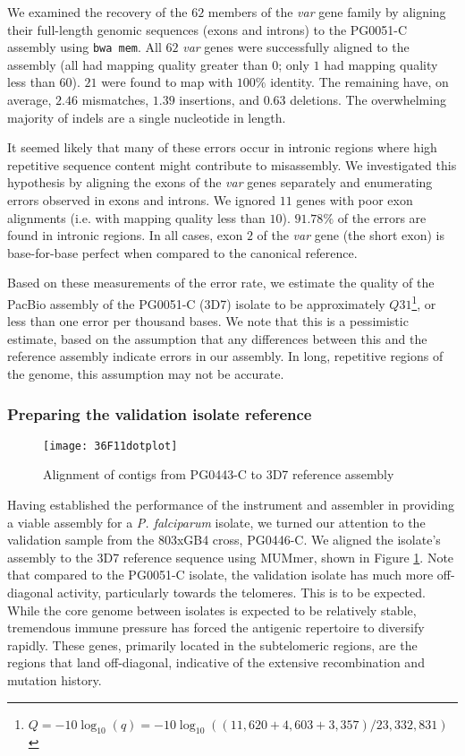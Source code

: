 We examined the recovery of the $62$ members of the \textit{var} gene family by aligning their full-length genomic sequences (exons and introns) to the PG0051-C assembly using \texttt{bwa mem}. All $62$ \textit{var} genes were successfully aligned to the assembly (all had mapping quality greater than $0$; only $1$ had mapping quality less than 60).  $21$ were found to map with $100\%$ identity. The remaining have, on average, $2.46$ mismatches, $1.39$ insertions, and $0.63$ deletions. The overwhelming majority of indels are a single nucleotide in length.

It seemed likely that many of these errors occur in intronic regions where high repetitive sequence content might contribute to misassembly. We investigated this hypothesis by aligning the exons of the \textit{var} genes separately and enumerating errors observed in exons and introns. We ignored $11$ genes with poor exon alignments (i.e. with mapping quality less than $10$). $91.78\%$ of the errors are found in intronic regions. In all cases, exon $2$ of the \textit{var} gene (the short exon) is base-for-base perfect when compared to the canonical reference.

Based on these measurements of the error rate, we estimate the quality of the PacBio assembly of the PG0051-C (3D7) isolate to be approximately $Q31$\footnote{$Q = -10{\log}_{10}(q) = -10{\log}_{10}((11,620 + 4,603 + 3,357)/23,332,831)$}, or less than one error per thousand bases.  We note that this is a pessimistic estimate, based on the assumption that any differences between this and the reference assembly indicate errors in our assembly.  In long, repetitive regions of the genome, this assumption may not be accurate.

\subsubsection{Preparing the validation isolate reference}

\begin{figure}[h!]
  \centering
    \texttt{[image: 36F11dotplot]}
  \caption{Alignment of contigs from PG0443-C to 3D7 reference assembly}
  \label{fig:valdotplot}
\end{figure}

Having established the performance of the instrument and assembler in providing a viable assembly for a \textit{P. falciparum} isolate, we turned our attention to the validation sample from the 803xGB4 cross, PG0446-C.  We aligned the isolate's assembly to the 3D7 reference sequence using MUMmer, shown in Figure \ref{fig:valdotplot}.  Note that compared to the PG0051-C isolate, the validation isolate has much more off-diagonal activity, particularly towards the telomeres.  This is to be expected.  While the core genome between isolates is expected to be relatively stable, tremendous immune pressure has forced the antigenic repertoire to diversify rapidly.  These genes, primarily located in the subtelomeric regions, are the regions that land off-diagonal, indicative of the extensive recombination and mutation history.

